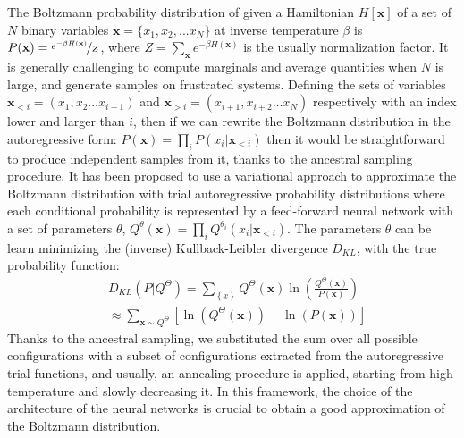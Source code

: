 \documentclass[aps,physrev,10pt,floatfix,reprint]{revtex4-2}
\begin{document}
The Boltzmann probability distribution of given a Hamiltonian $H[\mathbf{x}]$ of a set of $N$ binary variables $\mathbf{x}=\{x_1, x_2,...x_N\}$ at inverse temperature $\beta$ is $P(\mathbf{x}) = \nicefrac{e^{-\beta H\left(\mathbf{x}\right)}}{Z}$, where $Z=\sum_{\mathbf{x}}e^{-\beta H\left(\mathbf{x}\right)}$ is the usually normalization factor.
It is generally challenging to compute marginals and average quantities when $N$ is large, and generate samples on frustrated systems. Defining the sets of variables $\mathbf{x}_{<i}=\left(x_{1},x_{2}\dots x_{i-1}\right)$ and $\mathbf{x}_{>i}=\left(x_{i+1},x_{i+2}\dots x_{N}\right)$ respectively with an index lower and larger than $i$, then if we can rewrite the Boltzmann distribution in the autoregressive form:
$
P\left(\mathbf{x}\right)=\prod_{i}P\left(x_{i}|\mathbf{x}_{<i}\right)
$
then it would be straightforward to produce independent samples from it, thanks to the ancestral sampling procedure. It has been proposed to use a variational approach to approximate the Boltzmann distribution with trial autoregressive probability distributions where each conditional probability is represented by a feed-forward neural network with a set of parameters ${\theta}$,
$
Q^{\theta}\left(\mathbf{x}\right)=\prod_{i}Q^{\theta_i}\left(x_{i}|\mathbf{x}_{<i}\right)
$.
The parameters ${\theta}$ can be learn minimizing the (inverse) Kullback-Leibler divergence $D_{KL}$,
with the true probability function:
\begin{equation}
\begin{split}
& D_{KL}\left(P|Q^{\Theta}\right) =  \sum_{\left\{ x\right\} }Q^{\Theta}\left(\mathbf{x} \right)\ln\left(\frac{Q^{\Theta}\left(\mathbf{x} \right)}{P\left(\mathbf{x} \right)}\right)  \\
& \approx \sum_{\mathbf{x}\sim Q^{\Theta}}\left[\ln\left(Q^{\Theta}\left(\mathbf{x} \right)\right)-\ln\left(P\left(\mathbf{x} \right)\right)\right]
\end{split}    
\end{equation}
Thanks to the ancestral sampling, we substituted the sum over all possible configurations with a subset of configurations extracted from the autoregressive trial functions, and usually, an annealing procedure is applied, starting from high temperature and slowly decreasing it.
In this framework, the choice of the architecture of the neural networks is crucial to obtain a good approximation of the Boltzmann distribution.
\end{document}
